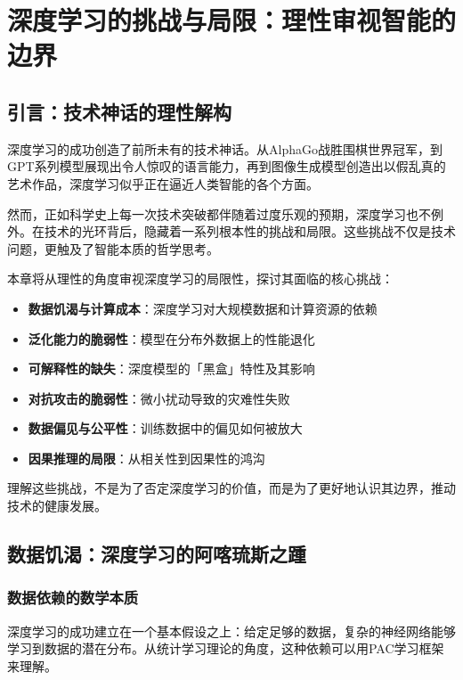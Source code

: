 \chapter{深度学习的挑战与局限：理性审视智能的边界}

\section{引言：技术神话的理性解构}

深度学习的成功创造了前所未有的技术神话。从AlphaGo战胜围棋世界冠军，到GPT系列模型展现出令人惊叹的语言能力，再到图像生成模型创造出以假乱真的艺术作品，深度学习似乎正在逼近人类智能的各个方面。

然而，正如科学史上每一次技术突破都伴随着过度乐观的预期，深度学习也不例外。在技术的光环背后，隐藏着一系列根本性的挑战和局限。这些挑战不仅是技术问题，更触及了智能本质的哲学思考。

本章将从理性的角度审视深度学习的局限性，探讨其面临的核心挑战：

\begin{itemize}
\item \textbf{数据饥渴与计算成本}：深度学习对大规模数据和计算资源的依赖
\item \textbf{泛化能力的脆弱性}：模型在分布外数据上的性能退化
\item \textbf{可解释性的缺失}：深度模型的「黑盒」特性及其影响
\item \textbf{对抗攻击的脆弱性}：微小扰动导致的灾难性失败
\item \textbf{数据偏见与公平性}：训练数据中的偏见如何被放大
\item \textbf{因果推理的局限}：从相关性到因果性的鸿沟
\end{itemize}

理解这些挑战，不是为了否定深度学习的价值，而是为了更好地认识其边界，推动技术的健康发展。

\section{数据饥渴：深度学习的阿喀琉斯之踵}

\subsection{数据依赖的数学本质}

深度学习的成功建立在一个基本假设之上：给定足够的数据，复杂的神经网络能够学习到数据的潜在分布。从统计学习理论的角度，这种依赖可以用PAC学习框架来理解。

